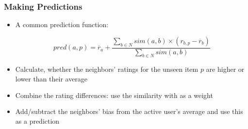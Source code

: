 \documentclass{beamer}
\begin{document}
\begin{frame}
    \frametitle{Making Predictions}
    \begin{itemize}
    \item A common prediction function:
        \begin{block}{}
            \begin{displaymath}
                pred(a,p) = \overline{r}_a + \frac{\sum_{b \in N}sim(a,b) \times (r_{b,p}-\overline{r}_b)}{\sum_{b \in N}sim(a,b)}
            \end{displaymath}
        \end{block}
    \item Calculate, whether the neighbors' ratings for the unseen item $p$ are
        higher or lower than their average
    \item Combine the rating differences: use the similarity with as a weight
    \item Add/subtract the neighbors' bias from the active user's average and
        use this as a prediction
    \end{itemize}
\end{frame}

\end{document}

